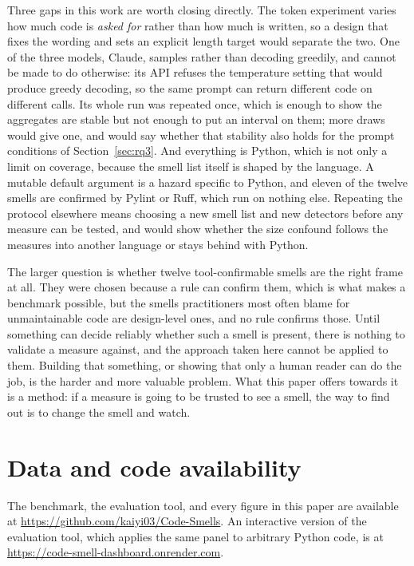 \documentclass[10pt,a4paper,twocolumn]{article}
\newif\ifanon
\begin{document}
Three gaps in this work are worth closing directly. The token experiment varies
how much code is \emph{asked for} rather than how much is written, so a design
that fixes the wording and sets an explicit length target would separate the
two. One of the three models, Claude, samples rather than decoding greedily, and
cannot be made to do otherwise: its API refuses the temperature setting that
would produce greedy decoding, so the same prompt can return different code on
different calls. Its whole run was repeated once, which is enough to show the
aggregates are stable but not enough to put an interval on them; more draws
would give one, and would say whether that stability also holds for the prompt
conditions of Section~\ref{sec:rq3}. And everything is Python, which is not only
a limit on coverage, because the smell list itself is shaped by the language. A
mutable default argument is a hazard specific to Python, and eleven of the
twelve smells are confirmed by Pylint or Ruff, which run on nothing else.
Repeating the protocol elsewhere means choosing a new smell list and new
detectors before any measure can be tested, and would show whether the size
confound follows the measures into another language or stays behind with Python.

The larger question is whether twelve tool-confirmable smells are the right
frame at all. They were chosen because a rule can confirm them, which is what
makes a benchmark possible, but the smells practitioners most often blame for
unmaintainable code are design-level ones, and no rule confirms those. Until
something can decide reliably whether such a smell is present, there is nothing
to validate a measure against, and the approach taken here cannot be applied to
them. Building that something, or showing that only a human reader can do the
job, is the harder and more valuable problem. What this paper offers towards it
is a method: if a measure is going to be trusted to see a smell, the way to find
out is to change the smell and watch.



\section*{Data and code availability}
\ifanon
The benchmark, the evaluation tool, and every figure in this paper are released
openly. The repository and the hosted version of the tool are withheld here
because their addresses identify the authors, and will be given on acceptance.
\else
The benchmark, the evaluation tool, and every figure in this paper are available
at \url{https://github.com/kaiyi03/Code-Smells}. An interactive version of the
evaluation tool, which applies the same panel to arbitrary Python code, is at
\url{https://code-smell-dashboard.onrender.com}.
\fi

\balance


\end{document}
